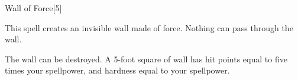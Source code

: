 \begin{spellsection}{Wall of Force}[5]
    \begin{spellheader}
    \end{spellheader}
    \begin{spellcontent}
        \begin{spelltargetinginfo}
        \end{spelltargetinginfo}
        \begin{spelleffects}
            \spelleffect This spell creates an invisible wall made of force. Nothing can pass through the wall.
            \spelldur \durshort \dismissable
        \end{spelleffects}
    \end{spellcontent}
    \begin{spellfooter}
        \spellnotes The wall can be destroyed. A 5-foot square of wall has hit points equal to five times your spellpower, and hardness equal to your spellpower.

        \forcespellnotes
        \miscastexplode
    \end{spellfooter}
\end{spellsection}


